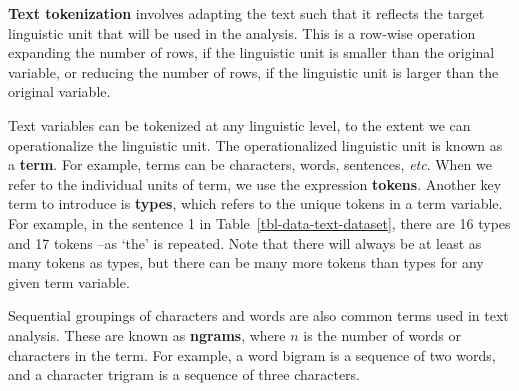 \documentclass[
  letterpaper,
  krantz1]{latex/krantz-mod}
\theoremstyle{definition}
\theoremstyle{definition}
\theoremstyle{remark}
\begin{document}
\textbf{Text tokenization} involves adapting the text such that it
reflects the target linguistic unit that will be used in the analysis.
This is a row-wise operation expanding the number of rows, if the
linguistic unit is smaller than the original variable, or reducing the
number of rows, if the linguistic unit is larger than the original
variable.

Text variables can be tokenized at any linguistic level, to the extent
we can operationalize the linguistic unit. The operationalized
linguistic unit is known as a \textbf{term}. For example, terms can be
characters, words, sentences, \emph{etc}. When we refer to the
individual units of term, we use the expression \textbf{tokens}. Another
key term to introduce is \textbf{types}, which refers to the unique
tokens in a term variable. For example, in the sentence 1 in
Table~\ref{tbl-data-text-dataset}, there are 16 types and 17 tokens --as
`the' is repeated. Note that there will always be at least as many
tokens as types, but there can be many more tokens than types for any
given term variable.

Sequential groupings of characters and words are also common terms used
in text analysis. These are known as \textbf{ngrams}, where \(n\) is the
number of words or characters in the term. For example, a word bigram is
a sequence of two words, and a character trigram is a sequence of three
characters.
\end{document}
